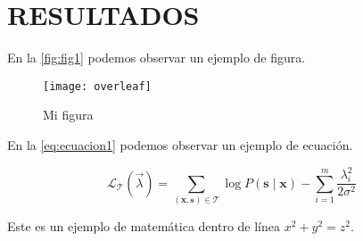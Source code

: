 \chapter{RESULTADOS}

\lipsum[1-1] \parencite{texbook}

En la \autoref{fig:fig1} podemos observar un ejemplo de figura.

\begin{figure}[H]
	\centering
	\texttt{[image: overleaf]}
	\caption{Mi figura}\label{fig:fig1}
\end{figure}

En la \autoref{eq:ecuacion1} podemos observar un ejemplo de ecuación.

\begin{eq}[H]
	\caption{Mi ecuación}\label{eq:ecuacion1}
	\[
		\mathcal L_{\mathcal T}(\vec{\lambda})
		= \sum_{(\mathbf{x},\mathbf{s})\in \mathcal T}
		\log P(\mathbf{s}\mid\mathbf{x}) - \sum_{i=1}^m
		\frac{\lambda_i^2}{2\sigma^2}
	\]
\end{eq}

Este es un ejemplo de matemática dentro de línea \(x^2 + y^2 = z^2\).